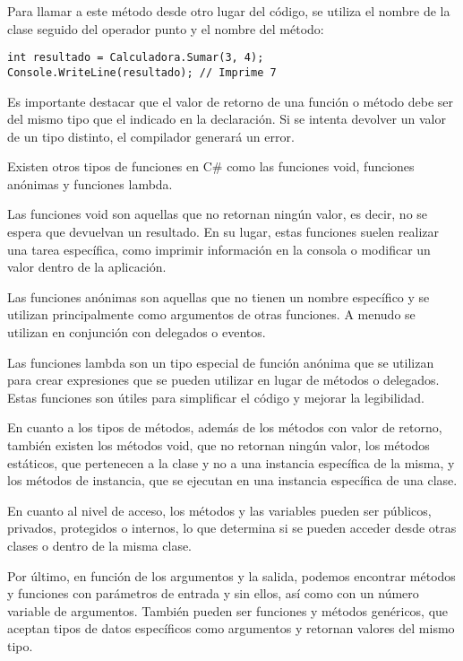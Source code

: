 \documentclass[executivepaper]{article}
\begin{document}
Para llamar a este método desde otro lugar del código, se utiliza el nombre de la clase seguido del operador punto y el nombre del método:

\begin{lstlisting}
int resultado = Calculadora.Sumar(3, 4);
Console.WriteLine(resultado); // Imprime 7
\end{lstlisting}

Es importante destacar que el valor de retorno de una función o método debe ser del mismo tipo que el indicado en la declaración. Si se intenta devolver un valor de un tipo distinto, el compilador generará un error.

Existen otros tipos de funciones en C\# como las funciones void, funciones anónimas y funciones lambda.

Las funciones void son aquellas que no retornan ningún valor, es decir, no se espera que devuelvan un resultado. En su lugar, estas funciones suelen realizar una tarea específica, como imprimir información en la consola o modificar un valor dentro de la aplicación.

Las funciones anónimas son aquellas que no tienen un nombre específico y se utilizan principalmente como argumentos de otras funciones. A menudo se utilizan en conjunción con delegados o eventos.

Las funciones lambda son un tipo especial de función anónima que se utilizan para crear expresiones que se pueden utilizar en lugar de métodos o delegados. Estas funciones son útiles para simplificar el código y mejorar la legibilidad.

En cuanto a los tipos de métodos, además de los métodos con valor de retorno, también existen los métodos void, que no retornan ningún valor, los métodos estáticos, que pertenecen a la clase y no a una instancia específica de la misma, y los métodos de instancia, que se ejecutan en una instancia específica de una clase.

En cuanto al nivel de acceso, los métodos y las variables pueden ser públicos, privados, protegidos o internos, lo que determina si se pueden acceder desde otras clases o dentro de la misma clase.

Por último, en función de los argumentos y la salida, podemos encontrar métodos y funciones con parámetros de entrada y sin ellos, así como con un número variable de argumentos. También pueden ser funciones y métodos genéricos, que aceptan tipos de datos específicos como argumentos y retornan valores del mismo tipo.
\end{document}
